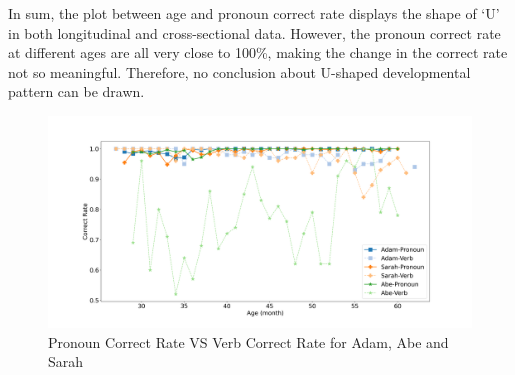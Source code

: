 In sum, the plot between age and pronoun correct rate displays the shape of `U' in both longitudinal and cross-sectional data. However, the pronoun correct rate at different ages are all very close to 100\%, making the change in the correct rate not so meaningful. Therefore, no conclusion about U-shaped developmental pattern can be drawn. 
 

\FloatBarrier
\begin{figure}[h]
\includegraphics[scale = 0.35, width = \linewidth]{graph/AgeVerb.png}
\vspace{-3em}
\caption{Pronoun Correct Rate VS Verb Correct Rate for Adam, Abe and Sarah}
\label{fig:3}
\end{figure}
\FloatBarrier



